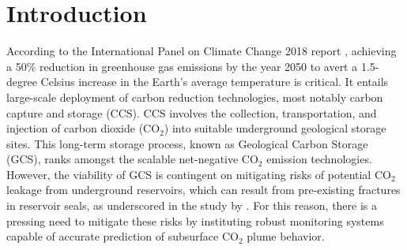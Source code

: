\documentclass{article}
\begin{document}
\section{Introduction}
%
According to the International Panel on Climate Change 2018 report \cite{IPCC2018}, achieving a 50$\%$ reduction in greenhouse gas emissions by the year 2050 to avert a 1.5-degree Celsius increase in the Earth's average temperature is critical. It entails large-scale deployment of carbon reduction technologies, most notably carbon capture and storage (CCS). CCS involves the collection, transportation, and injection of carbon dioxide (CO${_2}$) into suitable underground geological storage sites. This long-term storage process, known as Geological Carbon Storage (GCS), ranks amongst the scalable net-negative CO$_2$ emission technologies. However, the viability of GCS is contingent on mitigating risks of potential CO${_2}$ leakage from underground reservoirs, which can result from pre-existing fractures in reservoir seals, as underscored in the study by \cite{ringrose2020store}. For this reason, there is a pressing need to mitigate these risks by instituting robust monitoring systems capable of accurate prediction of subsurface CO${_2}$ plume behavior. 

\end{document}
